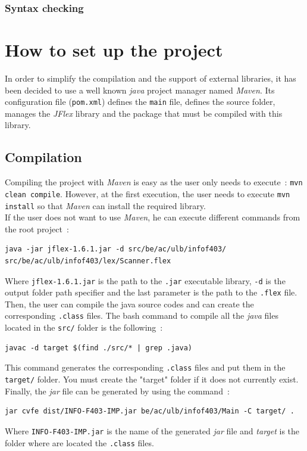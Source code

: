 \documentclass[a4paper,11pt]{article}
\begin{document}
    \subsubsection{Syntax checking}

\section{How to set up the project}
  In order to simplify the compilation and the support of external libraries, it has been decided to use a well known \textit{java} project manager named \textit{Maven}. Its configuration file (\verb|pom.xml|) defines the \verb|main| file, defines the source folder, manages the \textit{JFlex} library and the package that must be compiled with this library.
  \subsection{Compilation}
    Compiling the project with \textit{Maven} is easy as the user only needs to execute~: \verb|mvn clean compile|. However, at the first execution, the user needs to execute \verb|mvn install| so that \textit{Maven} can install the required library.\\
    If the user does not want to use \textit{Maven}, he can execute different commands from the root project~:
    \begin{verbatim}
java -jar jflex-1.6.1.jar -d src/be/ac/ulb/infof403/ src/be/ac/ulb/infof403/lex/Scanner.flex
    \end{verbatim}
    Where \verb|jflex-1.6.1.jar| is the path to the \verb|.jar| executable library,  \verb|-d| is the output folder path specifier and the last parameter is the path to the \verb|.flex| file.\\
    Then, the user can compile the java source codes and can create the corresponding \verb|.class| files. The bash command to compile all the \textit{java} files located in the \verb|src/| folder is the following~:
    \begin{verbatim}
javac -d target $(find ./src/* | grep .java)
    \end{verbatim}
    This command generates the corresponding \verb|.class| files and put them in the \verb|target/| folder. You must create the "target" folder if it does not currently exist. Finally, the \textit{jar} file can be generated by using the command~:
    \begin{verbatim}
jar cvfe dist/INFO-F403-IMP.jar be/ac/ulb/infof403/Main -C target/ .
    \end{verbatim}
    Where \verb|INFO-F403-IMP.jar| is the name of the generated \textit{jar} file and \textit{target} is the folder where are located the \verb|.class| files.
    
\end{document}
